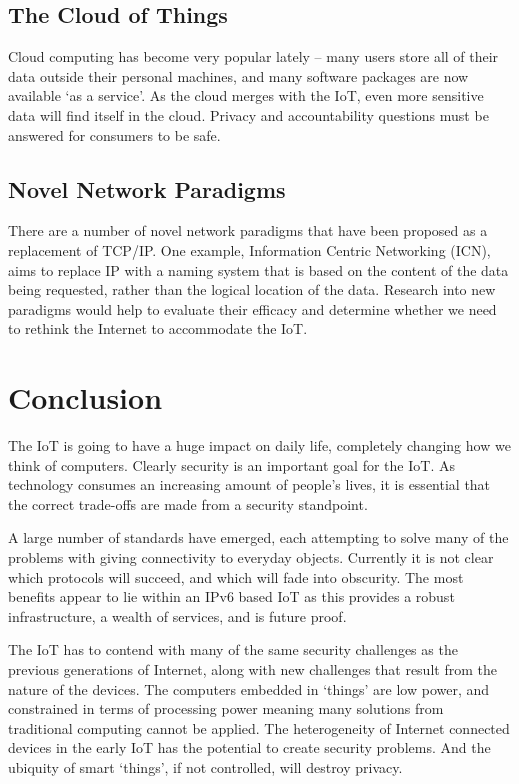 \documentclass[10pt,journal,compsoc]{IEEEtran}
\begin{document}
\subsection{The Cloud of Things}
Cloud computing has become very popular lately -- many users store all of their
data outside their personal machines, and many software packages are now
available `as a service'. As the cloud merges with the IoT, even more sensitive
data will find itself in the cloud. Privacy and accountability questions must
be answered for consumers to be safe.

\subsection{Novel Network Paradigms}
There are a number of novel network paradigms that have been proposed as a
replacement of TCP/IP. One example, Information Centric Networking (ICN), aims
to replace IP with a naming system that is based on the content of the data
being requested, rather than the logical location of the data. Research into
new paradigms would help to evaluate their efficacy and determine whether we
need to rethink the Internet to accommodate the IoT. 


\section{Conclusion}
The IoT is going to have a huge impact on daily life, completely changing how
we think of computers. Clearly security is an important goal
for the IoT. As technology consumes an increasing amount of people's lives, it
is essential that the correct trade-offs are made from a security standpoint. 

A large number of standards have emerged, each attempting to solve many of the
problems with giving connectivity to everyday objects. Currently it is not
clear which protocols will succeed, and which will fade into obscurity. The
most benefits appear to lie within an IPv6 based IoT as this provides a robust
infrastructure, a wealth of services, and is future proof.  

The IoT has to contend with many of the same security challenges as the
previous generations of Internet, along with new challenges that result from
the nature of the devices. The computers embedded in `things' are low power,
and constrained in terms of processing power meaning many solutions from
traditional computing cannot be applied. The heterogeneity of Internet
connected devices in the early IoT has the potential to create security
problems. And the ubiquity of smart `things', if not controlled, will destroy
privacy. 
\end{document}
